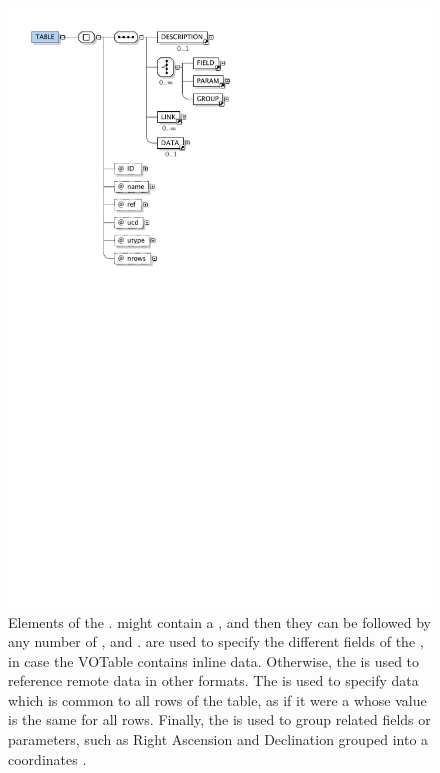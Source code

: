 \begin{figure}[tbp]
	\centering
		\includegraphics[scale=1]{fig/VOTableTableTag.pdf}
	\caption[Elements of the ]{
		Elements of the .  might contain
		a , and then they can be followed by
		any number of ,  and
		.  are used to specify the
		different fields of the , in case the VOTable
		contains inline data. Otherwise, the  is used
		to reference remote data in other formats.
		The 
		is used to specify data which is common to all rows of the
		table, as if it were a  whose value is the
		same for all rows. Finally, the  is used to
		group related fields or parameters, such as Right Ascension
		and Declination grouped into a coordinates .
		\oxygenxml
	}
	\label{fig:fig_VOTableTableTag}
\end{figure}

